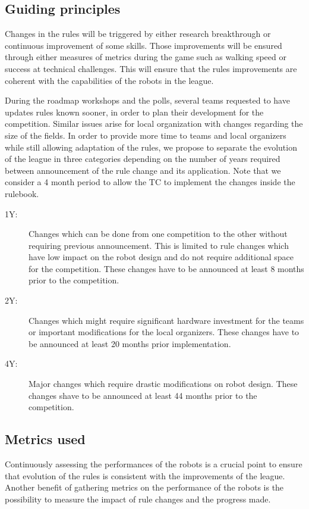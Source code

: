 \documentclass{article}
\begin{document}

\subsection{Guiding principles}

Changes in the rules will be triggered by either research breakthrough or
continuous improvement of some skills. Those improvements will be ensured
through either measures of metrics during the game such as walking speed or
success at technical challenges. This will ensure that the rules improvements
are coherent with the capabilities of the robots in the league.

During the roadmap workshops and the polls, several teams requested to have
updates rules known sooner, in order to plan their development for the
competition. Similar issues arise for local organization with changes regarding
the size of the fields. In order to provide more time to teams and local
organizers while still allowing adaptation of the rules, we propose to separate
the evolution of the league in three categories depending on the number of years
required between announcement of the rule change and its application. Note that
we consider a 4 month period to allow the TC to implement the changes inside the
rulebook.
\begin{description}
\item[1Y:] Changes which can be done from one competition to the other without
  requiring previous announcement. This is limited to rule changes which have
  low impact on the robot design and do not require additional space for the
  competition. These changes have to be announced at least 8 months prior
  to the competition.
\item[2Y:] Changes which might require significant hardware investment for the
  teams or important modifications for the local organizers. These changes have
  to be announced at least 20 months prior implementation.
\item[4Y:] Major changes which require drastic modifications on robot design.
  These changes shave to be announced at least 44 months prior to the
  competition.
\end{description}

\subsection{\label{sec:metrics}Metrics used}
Continuously assessing the performances of the robots is a crucial point to
ensure that evolution of the rules is consistent with the improvements of the league.
Another benefit of gathering metrics on the performance of the robots is the possibility to
measure the impact of rule changes and the progress made.
\end{document}
